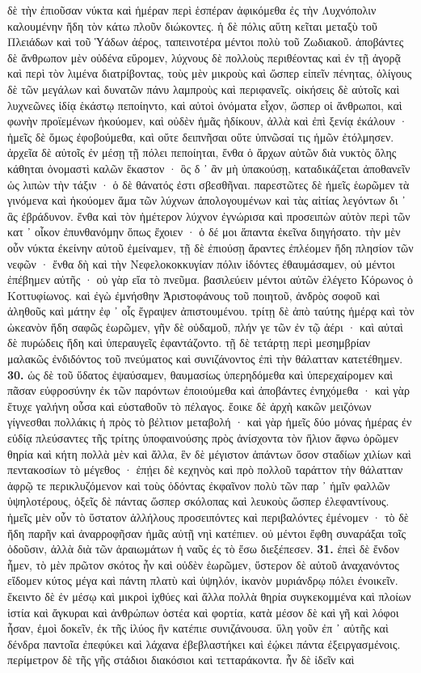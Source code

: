 \documentclass[a4paper, 11pt, oneside, polutonikogreek, german]{article}
\begin{document}
δὲ τὴν ἐπιοῦσαν νύκτα καὶ ἡμέραν περὶ ἑσπέραν ἀφικόμεθα ἐς τὴν Λυχνόπολιν καλουμένην ἤδη τὸν κάτω πλοῦν διώκοντες. ἡ δὲ πόλις αὕτη κεῖται μεταξὺ τοῦ Πλειάδων καὶ τοῦ Ὑάδων ἀέρος, ταπεινοτέρα μέντοι πολὺ τοῦ Ζωδιακοῦ. ἀποβάντες δὲ ἄνθρωπον μὲν οὐδένα εὕρομεν, λύχνους δὲ πολλοὺς περιθέοντας καὶ ἐν τῇ ἀγορᾷ καὶ περὶ τὸν λιμένα διατρίβοντας, τοὺς μὲν μικροὺς καὶ ὥσπερ εἰπεῖν πένητας, ὀλίγους δὲ τῶν μεγάλων καὶ δυνατῶν πάνυ λαμπροὺς καὶ περιφανεῖς. οἰκήσεις δὲ αὐτοῖς καὶ λυχνεῶνες ἰδίᾳ ἑκάστῳ πεποίηντο, καὶ αὐτοὶ ὀνόματα εἶχον, ὥσπερ οἱ ἄνθρωποι, καὶ φωνὴν προϊεμένων ἠκούομεν, καὶ οὐδὲν ἡμᾶς ἠδίκουν, ἀλλὰ καὶ ἐπὶ ξενίᾳ ἐκάλουν · ἡμεῖς δὲ ὅμως ἐφοβούμεθα, καὶ οὔτε δειπνῆσαι οὔτε ὑπνῶσαί τις ἡμῶν ἐτόλμησεν. ἀρχεῖα δὲ αὐτοῖς ἐν μέσῃ τῇ πόλει πεποίηται, ἔνθα ὁ ἄρχων αὐτῶν διὰ νυκτὸς ὅλης κάθηται ὀνομαστὶ καλῶν ἕκαστον · ὃς δ ᾽ ἂν μὴ ὑπακούσῃ, καταδικάζεται ἀποθανεῖν ὡς λιπὼν τὴν τάξιν · ὁ δὲ θάνατός ἐστι σβεσθῆναι. παρεστῶτες δὲ ἡμεῖς ἑωρῶμεν τὰ γινόμενα καὶ ἠκούομεν ἅμα τῶν λύχνων ἀπολογουμένων καὶ τὰς αἰτίας λεγόντων δι ᾽ ἃς ἐβράδυνον. ἔνθα καὶ τὸν ἡμέτερον λύχνον ἐγνώρισα καὶ προσειπὼν αὐτὸν περὶ τῶν κατ ᾽ οἶκον ἐπυνθανόμην ὅπως ἔχοιεν · ὁ δέ μοι ἅπαντα ἐκεῖνα διηγήσατο. τὴν μὲν οὖν νύκτα ἐκείνην αὐτοῦ ἐμείναμεν, τῇ δὲ ἐπιούσῃ ἄραντες ἐπλέομεν ἤδη πλησίον τῶν νεφῶν · ἔνθα δὴ καὶ τὴν Νεφελοκοκκυγίαν πόλιν ἰδόντες ἐθαυμάσαμεν, οὐ μέντοι ἐπέβημεν αὐτῆς · οὐ γὰρ εἴα τὸ πνεῦμα. βασιλεύειν μέντοι αὐτῶν ἐλέγετο Κόρωνος ὁ Κοττυφίωνος. καὶ ἐγὼ ἐμνήσθην Ἀριστοφάνους τοῦ ποιητοῦ, ἀνδρὸς σοφοῦ καὶ ἀληθοῦς καὶ μάτην ἐφ ᾽ οἷς ἔγραψεν ἀπιστουμένου. τρίτῃ δὲ ἀπὸ ταύτης ἡμέρᾳ καὶ τὸν ὠκεανὸν ἤδη σαφῶς ἑωρῶμεν, γῆν δὲ οὐδαμοῦ, πλήν γε τῶν ἐν τῷ ἀέρι · καὶ αὐταὶ δὲ πυρώδεις ἤδη καὶ ὑπεραυγεῖς ἐφαντάζοντο. τῇ δὲ τετάρτῃ περὶ μεσημβρίαν μαλακῶς ἐνδιδόντος τοῦ πνεύματος καὶ συνιζάνοντος ἐπὶ τὴν θάλατταν κατετέθημεν. \textbf{30.} ὡς δὲ τοῦ ὕδατος ἐψαύσαμεν, θαυμασίως ὑπερηδόμεθα καὶ ὑπερεχαίρομεν καὶ πᾶσαν εὐφροσύνην ἐκ τῶν παρόντων ἐποιούμεθα καὶ ἀποβάντες ἐνηχόμεθα · καὶ γὰρ ἔτυχε γαλήνη οὖσα καὶ εὐσταθοῦν τὸ πέλαγος. ἔοικε δὲ ἀρχὴ κακῶν μειζόνων γίγνεσθαι πολλάκις ἡ πρὸς τὸ βέλτιον μεταβολή · καὶ γὰρ ἡμεῖς δύο μόνας ἡμέρας ἐν εὐδίᾳ πλεύσαντες τῆς τρίτης ὑποφαινούσης πρὸς ἀνίσχοντα τὸν ἥλιον ἄφνω ὁρῶμεν θηρία καὶ κήτη πολλὰ μὲν καὶ ἄλλα, ἓν δὲ μέγιστον ἁπάντων ὅσον σταδίων χιλίων καὶ πεντακοσίων τὸ μέγεθος · ἐπῄει δὲ κεχηνὸς καὶ πρὸ πολλοῦ ταράττον τὴν θάλατταν ἀφρῷ τε περικλυζόμενον καὶ τοὺς ὀδόντας ἐκφαῖνον πολὺ τῶν παρ ᾽ ἡμῖν φαλλῶν ὑψηλοτέρους, ὀξεῖς δὲ πάντας ὥσπερ σκόλοπας καὶ λευκοὺς ὥσπερ ἐλεφαντίνους. ἡμεῖς μὲν οὖν τὸ ὕστατον ἀλλήλους προσειπόντες καὶ περιβαλόντες ἐμένομεν · τὸ δὲ ἤδη παρῆν καὶ ἀναρροφῆσαν ἡμᾶς αὐτῇ νηὶ κατέπιεν. οὐ μέντοι ἔφθη συναράξαι τοῖς ὀδοῦσιν, ἀλλὰ διὰ τῶν ἀραιωμάτων ἡ ναῦς ἐς τὸ ἔσω διεξέπεσεν. \textbf{31.} ἐπεὶ δὲ ἔνδον ἦμεν, τὸ μὲν πρῶτον σκότος ἦν καὶ οὐδὲν ἑωρῶμεν, ὕστερον δὲ αὐτοῦ ἀναχανόντος εἴδομεν κύτος μέγα καὶ πάντη πλατὺ καὶ ὑψηλόν, ἱκανὸν μυριάνδρῳ πόλει ἐνοικεῖν. ἔκειντο δὲ ἐν μέσῳ καὶ μικροὶ ἰχθύες καὶ ἄλλα πολλὰ θηρία συγκεκομμένα καὶ πλοίων ἱστία καὶ ἄγκυραι καὶ ἀνθρώπων ὀστέα καὶ φορτία, κατὰ μέσον δὲ καὶ γῆ καὶ λόφοι ἦσαν, ἐμοὶ δοκεῖν, ἐκ τῆς ἰλύος ἣν κατέπιε συνιζάνουσα. ὕλη γοῦν ἐπ ᾽ αὐτῆς καὶ δένδρα παντοῖα ἐπεφύκει καὶ λάχανα ἐβεβλαστήκει καὶ ἐῴκει πάντα ἐξειργασμένοις. περίμετρον δὲ τῆς γῆς στάδιοι διακόσιοι καὶ τετταράκοντα. ἦν δὲ ἰδεῖν καὶ 
\end{document}
